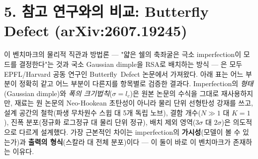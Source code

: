 \documentclass[11pt]{article}
\begin{document}
\section{5. 참고 연구와의 비교: Butterfly Defect (arXiv:2607.19245)}

이 벤치마크의 물리적 직관과 방법론 --- "얇은 쉘의 축좌굴은 극소 imperfection이
모드를 결정한다"는 것과 국소 Gaussian dimple을 RSA로 배치하는 방식 --- 은
모두 EPFL/Harvard 공동 연구인 Butterfly~Defect 논문에서 가져왔다. 아래 표는
어느 부분이 정확히 같고 어느 부분이 다른지를 항목별로 검증한 결과다.
Imperfection의 \emph{형태}(Gaussian dimple)와 \emph{폭의 크기법칙}($\sigma=l_c$)은
원본 논문의 수식을 그대로 재사용하지만, 재료는 원 논문의 Neo-Hookean 초탄성이
아니라 물리 단위 선형탄성 강재를 쓰고, 설계 공간의 철학(파생 무차원수 스윕 대
5개 독립 노브), 결함 개수($N\gg1$ 대 $K{=}1$), 진폭 분포(정규화 로그정규 대
물리 단위 정규), 배치 제외 영역($3\sigma$ 대 $2\sigma$)은 의도적으로 다르게
설계했다. 가장 근본적인 차이는 imperfection의 \textbf{가시성}(모델이 볼 수
있는가)과 \textbf{출력의 형식}(스칼라 대 전체 분포)이다 --- 이 둘이 바로 이
벤치마크가 존재하는 이유다.
\end{document}
